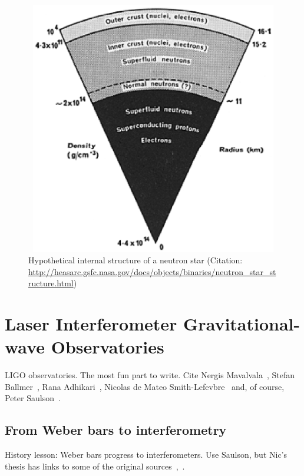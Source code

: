 	\begin{figure}
	\begin{center}
	\includegraphics[height=111mm, width=148mm]{neutron_star_structure.eps}
	\caption{Hypothetical internal structure of a neutron star (Citation: \url{http://heasarc.gsfc.nasa.gov/docs/objects/binaries/neutron_star_structure.html})} 
	\label{neutron_star_structure}
	\end{center}
	\end{figure}


    \section{Laser Interferometer Gravitational-wave Observatories}
    \label{LIGO}
        
        LIGO observatories. The most fun part to write. Cite Nergis Mavalvala~\cite{MavalvalaThesis}, Stefan Ballmer~\cite{BallmerThesis}, Rana Adhikari~\cite{AdhikariThesis}, Nicolas de Mateo Smith-Lefevbre~\cite{SmithThesis} and, of course, Peter Saulson~\cite{Saulson}.

        \subsection{From Weber bars to interferometry}
        \label{bars_to_interferometry}

            History lesson: Weber bars progress to interferometers. Use Saulson, but Nic's thesis has links to some of the original sources~\cite{Saulson},~\cite{SmithThesis}.           

